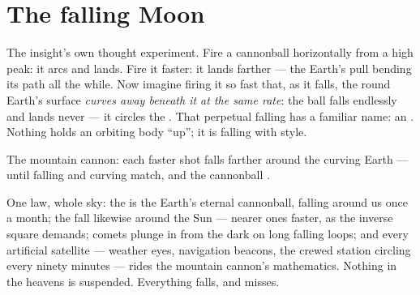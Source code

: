 \section{The falling Moon}

\begin{example}\label{ex:g9:gravitation:cannon}
The insight's own thought experiment. Fire a cannonball
horizontally from a high peak: it arcs and lands. Fire it
faster: it lands farther --- the Earth's pull bending its
path all the while. Now imagine firing it so fast that, as it
falls, the round Earth's surface \emph{curves away beneath it
at the same rate}: the ball falls endlessly and lands never
--- it circles the . That perpetual falling has a
familiar name: an \emph{}. Nothing holds an orbiting
body ``up''; it is falling with style.
\end{example}

\begin{omfigure}

{\small The mountain cannon: each faster shot falls farther
around the curving Earth --- until falling and curving match,
and the cannonball .}
\end{omfigure}

\begin{proposition}\label{prop:g9:gravitation:runs}
One law, whole sky: the  is the Earth's eternal
cannonball, falling around us once a month; the  fall
likewise around the Sun --- nearer ones faster, as the
inverse square demands; comets plunge in from the dark on
long falling loops; and every artificial satellite ---
weather eyes, navigation beacons, the crewed station circling
every ninety minutes --- rides the mountain cannon's
mathematics. Nothing in the heavens is suspended. Everything
falls, and misses.
\end{proposition}

